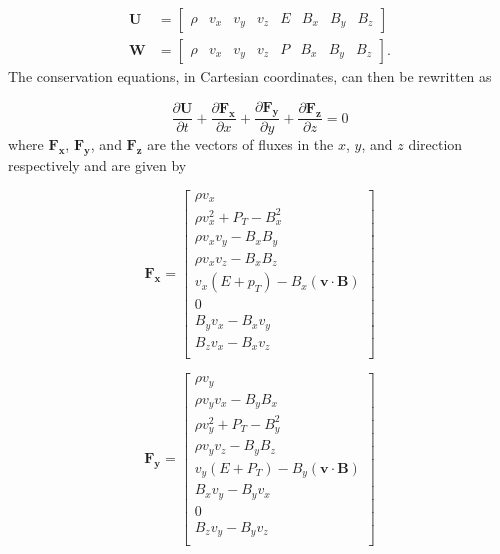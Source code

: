 \begin{align}
    \boldsymbol{U} &= \begin{bmatrix}
            \rho &
            v_x &
            v_y &
            v_z &
            E   &
            B_x &
            B_y &
            B_z
         \end{bmatrix}
    \\
    \boldsymbol{W} &= \begin{bmatrix}
            \rho &
            v_x &
            v_y &
            v_z &
            P   &
            B_x &
            B_y &
            B_z 
         \end{bmatrix}.
\end{align}
The conservation equations, in Cartesian coordinates, can then be rewritten as

\begin{equation}
    \label{eqn:vector-conserved}
    \frac{\partial \boldsymbol{U}}{\partial t} + 
    \frac{\partial \boldsymbol{F_x}}{\partial x} + 
    \frac{\partial \boldsymbol{F_y}}{\partial y} + 
    \frac{\partial \boldsymbol{F_z}}{\partial z} = 0 
\end{equation}
where $\boldsymbol{F_x}$, $\boldsymbol{F_y}$, and $\boldsymbol{F_z}$ are the vectors of fluxes in the $x$, $y$, and $z$ direction respectively and are given by

\begin{equation}
    \boldsymbol{F_x} = \begin{bmatrix}
            \rho v_{x} \\
            \rho v_{x}^2 + P_{T} - B_{x}^2 \\
            \rho v_{x} v_{y} - B_{x} B_{y} \\
            \rho v_{x} v_{z} - B_{x} B_{z} \\
            v_{x} \left( E + p_{T} \right) - B_{x} \left( \boldsymbol{v} \cdot \boldsymbol{B} \right) \\
            0 \\
            B_{y} v_{x} - B_{x} v_{y} \\
            B_{z} v_{x} - B_{x} v_{z} \\
         \end{bmatrix}
\end{equation}

\begin{equation}
    \boldsymbol{F_y} = \begin{bmatrix}
            \rho v_{y} \\
            \rho v_{y} v_{x} - B_{y} B_{x} \\
            \rho v_{y}^2 + P_{T} - B_{y}^2 \\
            \rho v_{y} v_{z} - B_{y} B_{z} \\
            v_{y} \left( E + P_{T} \right) - B_{y} \left( \boldsymbol{v} \cdot \boldsymbol{B} \right) \\
            B_{x} v_{y} - B_{y} v_{x} \\
            0 \\
            B_{z} v_{y} - B_{y} v_{z} \\
         \end{bmatrix}
\end{equation}

